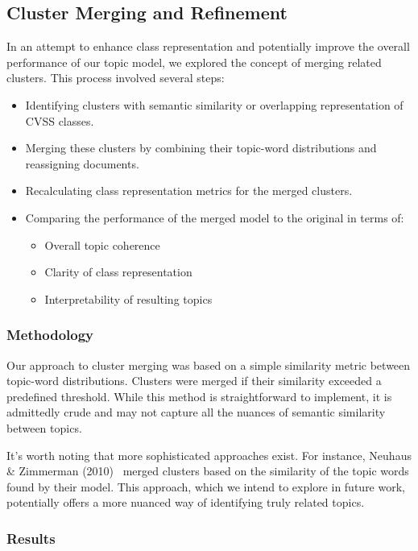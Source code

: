\subsection{Cluster Merging and Refinement}

In an attempt to enhance class representation and potentially improve the overall performance of our topic model, we explored the concept of merging related clusters. This process involved several steps:

\begin{itemize}
	\item Identifying clusters with semantic similarity or overlapping representation of CVSS classes.
	\item Merging these clusters by combining their topic-word distributions and reassigning documents.
	\item Recalculating class representation metrics for the merged clusters.
	\item Comparing the performance of the merged model to the original in terms of:
	      \begin{itemize}
		      \item Overall topic coherence
		      \item Clarity of class representation
		      \item Interpretability of resulting topics
	      \end{itemize}
\end{itemize}

\subsubsection{Methodology}

Our approach to cluster merging was based on a simple similarity metric between topic-word distributions. Clusters were merged if their similarity exceeded a predefined threshold. While this method is straightforward to implement, it is admittedly crude and may not capture all the nuances of semantic similarity between topics.

It's worth noting that more sophisticated approaches exist. For instance, Neuhaus \& Zimmerman (2010)~\cite{cve_topic_modelling} merged clusters based on the similarity of the topic words found by their model. This approach, which we intend to explore in future work, potentially offers a more nuanced way of identifying truly related topics.

\subsubsection{Results}


